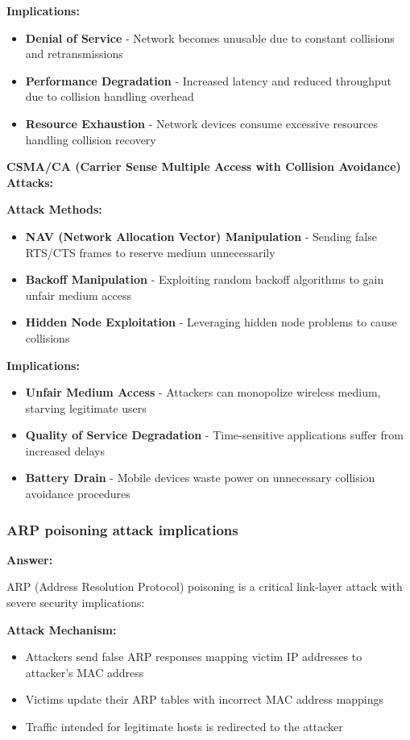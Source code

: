 \documentclass[12pt,a4paper]{article}
\begin{document}
\textbf{Implications:}
\begin{itemize}
    \item \textbf{Denial of Service} - Network becomes unusable due to constant collisions and retransmissions
    \item \textbf{Performance Degradation} - Increased latency and reduced throughput due to collision handling overhead
    \item \textbf{Resource Exhaustion} - Network devices consume excessive resources handling collision recovery
\end{itemize}

\textbf{CSMA/CA (Carrier Sense Multiple Access with Collision Avoidance) Attacks:}

\textbf{Attack Methods:}
\begin{itemize}
    \item \textbf{NAV (Network Allocation Vector) Manipulation} - Sending false RTS/CTS frames to reserve medium unnecessarily
    \item \textbf{Backoff Manipulation} - Exploiting random backoff algorithms to gain unfair medium access
    \item \textbf{Hidden Node Exploitation} - Leveraging hidden node problems to cause collisions
\end{itemize}

\textbf{Implications:}
\begin{itemize}
    \item \textbf{Unfair Medium Access} - Attackers can monopolize wireless medium, starving legitimate users
    \item \textbf{Quality of Service Degradation} - Time-sensitive applications suffer from increased delays
    \item \textbf{Battery Drain} - Mobile devices waste power on unnecessary collision avoidance procedures
\end{itemize}

\subsubsection{ARP poisoning attack implications}

\textbf{Answer:}

ARP (Address Resolution Protocol) poisoning is a critical link-layer attack with severe security implications:

\textbf{Attack Mechanism:}
\begin{itemize}
    \item Attackers send false ARP responses mapping victim IP addresses to attacker's MAC address
    \item Victims update their ARP tables with incorrect MAC address mappings
    \item Traffic intended for legitimate hosts is redirected to the attacker
\end{itemize}
\end{document}
